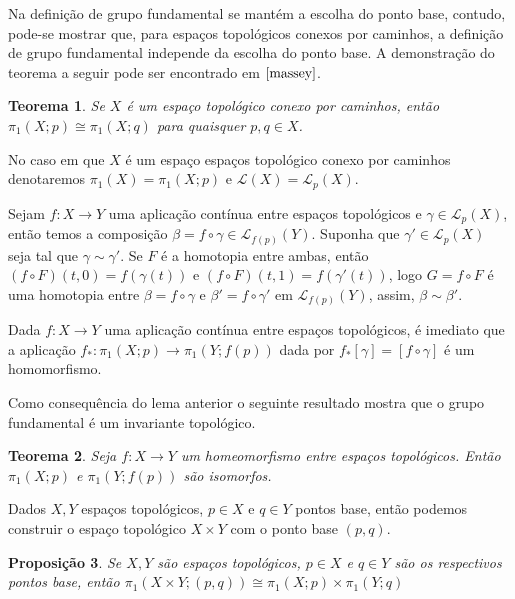 \documentclass[12pt]{book}
\newtheorem{teorema}{Teorema}[section]
\newtheorem{proposicao}[teorema]{Proposição}
\newcommand{\caminhos}{\mathcal{L}}
\newcommand{\caminhossempontobase}[1]{\caminhos(#1)}
\newcommand{\caminhospontobasegeral}[2]{\caminhos_{#1}(#2)}
\newcommand{\classe}[1]{[#1]}
\newcommand{\grupofundamental}[1]{\pi_{1}(#1)}
\newcommand{\grupofundamentalpontobase}[2]{\pi_{1}(#1; #2)}
\begin{document}
	Na definição de grupo fundamental se mantém a escolha do ponto base, contudo, pode-se mostrar que, para espaços topológicos conexos por caminhos, a definição de grupo fundamental independe da escolha do ponto base. A demonstração do teorema a seguir pode ser encontrado em $\cite{massey}$.
	
	\begin{teorema}
		Se $X$ é um espaço topológico conexo por caminhos, então $\grupofundamentalpontobase{X}{p} \cong \grupofundamentalpontobase{X}{q}$ para quaisquer $p,q \in X$.
	\end{teorema}
	
	No caso em que $X$ é um espaço espaços topológico conexo por caminhos denotaremos $\grupofundamental{X}=\grupofundamentalpontobase{X}{p}$ e $\caminhossempontobase{X}=\caminhospontobasegeral{p}{X}$.
	
	
	Sejam $f:X\to Y$ uma aplicação contínua entre espaços topológicos e $\gamma \in \caminhospontobasegeral{p}{X}$, então temos a composição $\beta=f\circ \gamma \in \caminhospontobasegeral{f(p)}{Y}$. Suponha que $\gamma' \in \caminhospontobasegeral{p}{X}$ seja tal que $\gamma \sim \gamma'$. Se $F$ é a homotopia entre ambas, então $(f\circ F)(t,0) =  f(\gamma(t))$ e $(f\circ F)(t,1) =  f(\gamma'(t)) $, logo $G=f\circ F$ é uma homotopia entre $\beta=f\circ \gamma$ e $\beta' = f\circ \gamma'$ em $\caminhospontobasegeral{f(p)}{Y}$, assim, $\beta \sim \beta'$.
	
	Dada $f:X\to Y$ uma aplicação contínua entre espaços topológicos, é imediato que a aplicação $f_{*}:\grupofundamentalpontobase{X}{p} \to \grupofundamentalpontobase{Y}{f(p)}$ dada por $f_{*}\classe{\gamma} = \classe{f\circ\gamma}$ é um homomorfismo.
	
	Como consequência do lema anterior o seguinte resultado mostra que o grupo fundamental é um invariante topológico.
	\begin{teorema}
		Seja $f:X\to Y$ um homeomorfismo entre espaços topológicos. Então $\grupofundamentalpontobase{X}{p}$ e $\grupofundamentalpontobase{Y}{f(p)}$ são isomorfos.
	\end{teorema}
	
	Dados $X, Y$ espaços topológicos, $p\in X$ e $q\in Y$ pontos base, então podemos construir o espaço topológico $X\times Y$ com o ponto base $(p,q)$.
	
	\begin{proposicao}\label{proposicao_produto_grupo_fundamental}
		Se $X, Y$ são espaços topológicos, $p\in X$ e $q\in Y$ são os respectivos pontos base, então $\grupofundamentalpontobase{X\times Y}{(p,q)} \cong \grupofundamentalpontobase{X}{p}\times \grupofundamentalpontobase{Y}{q}$
	\end{proposicao}
	
\end{document}
